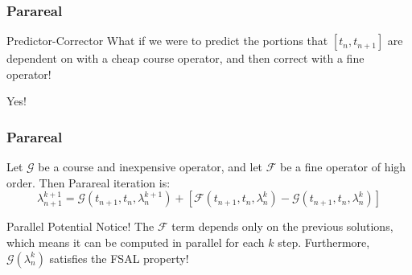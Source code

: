\documentclass[pdf,12pt]{beamer}
\begin{document}
\begin{frame}
  \frametitle{Parareal}
  \begin{alertblock}{Predictor-Corrector}
    What if we were to predict the portions that $[t_n, t_{n+1}]$ are dependent
    on with a cheap course operator, and then correct with a fine operator!
  \end{alertblock}
  Yes!
\end{frame}

\begin{frame}
  \frametitle{Parareal}
  Let $\mathcal{G}$ be a course and inexpensive operator, and let $\mathcal{F}$
  be a fine operator of high order. Then Parareal iteration is:
  \[
    \lambda_{n+1}^{k+1} = \mathcal{G}(t_{n+1},t_n,\lambda_n^{k+1}) + 
    \left[ \mathcal{F}(t_{n+1},t_n,\lambda_n^k) -
      \mathcal{G}(t_{n+1},t_n,\lambda_n^k) \right]
  \]
  \begin{block}{Parallel Potential}
    Notice! The $\mathcal{F}$ term depends only on the previous solutions, which
    means it can be computed in parallel for each $k$ step. Furthermore,
    $\mathcal{G}(\lambda_n^k)$ satisfies the FSAL property!
  \end{block}
\end{frame}
\end{document}
